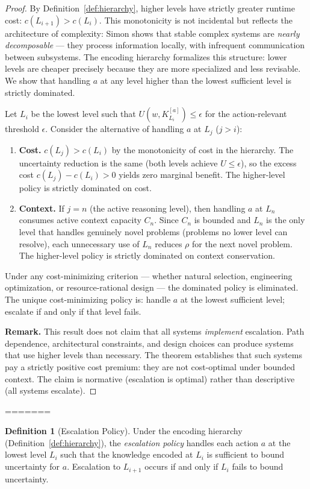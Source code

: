 \documentclass[11pt]{article}
\theoremstyle{definition}
\newtheorem{definition}{Definition}
\begin{document}
\begin{proof}
By Definition~\ref{def:hierarchy}, higher levels have strictly greater
runtime cost: $c(L_{i+1}) > c(L_i)$. This monotonicity is not
incidental but reflects the architecture of complexity: Simon
\cite{Simon1962} shows that stable complex systems are
\emph{nearly decomposable} --- they process information locally, with
infrequent communication between subsystems. The encoding hierarchy
formalizes this structure: lower levels are cheaper precisely because
they are more specialized and less revisable. We show that handling $a$
at any level higher than the lowest sufficient level is strictly
dominated.

Let $L_i$ be the lowest level such that $U(w, K^{[a]}_{L_i}) \leq
\epsilon$ for the action-relevant threshold $\epsilon$. Consider the
alternative of handling $a$ at $L_j$ ($j > i$):

\begin{enumerate}
\item \textbf{Cost.} $c(L_j) > c(L_i)$ by the monotonicity of cost in
   the hierarchy. The uncertainty reduction is the same (both levels
   achieve $U \leq \epsilon$), so the excess cost $c(L_j) - c(L_i) > 0$
   yields zero marginal benefit. The higher-level policy is strictly
   dominated on cost.

\item \textbf{Context.} If $j = n$ (the active reasoning level), then
   handling $a$ at $L_n$ consumes active context capacity $C_n$. Since
   $C_n$ is bounded and $L_n$ is the only level that handles genuinely
   novel problems (problems no lower level can resolve), each unnecessary
   use of $L_n$ reduces $\rho$ for the next novel problem. The
   higher-level policy is strictly dominated on context conservation.
\end{enumerate}

Under any cost-minimizing criterion --- whether natural selection,
engineering optimization, or resource-rational design --- the dominated
policy is eliminated. The unique cost-minimizing policy is: handle $a$
at the lowest sufficient level; escalate if and only if that level
fails.

\textbf{Remark.} This result does not claim that all systems
\emph{implement} escalation. Path dependence, architectural
constraints, and design choices can produce systems that use higher
levels than necessary. The theorem establishes that such systems pay a
strictly positive cost premium: they are not cost-optimal under bounded
context. The claim is normative (escalation is optimal) rather than
descriptive (all systems escalate).
\end{proof}
=======
\begin{definition}[Escalation Policy]
\label{def:escalation}
Under the encoding hierarchy (Definition~\ref{def:hierarchy}), the
\emph{escalation policy} handles each action $a$ at the lowest level
$L_i$ such that the knowledge encoded at $L_i$ is sufficient to bound
uncertainty for $a$. Escalation to $L_{i+1}$ occurs if and only if
$L_i$ fails to bound uncertainty.
\end{definition}
\end{document}
